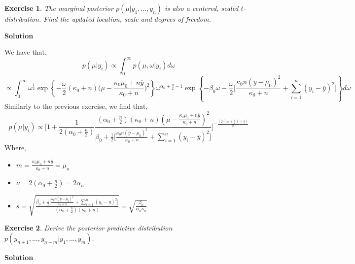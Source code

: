 \documentclass[twoside]{article}
\newcounter{lecnum}
\newtheorem{exercise}{Exercise}[lecnum]
\begin{document}
\color{black}

\begin{exercise}
  The marginal posterior $p(\mu|y_1,\dots, y_n)$ is also a centered, scaled $t$-distribution. Find the updated location, scale and degrees of freedom.
\end{exercise}

\color{blue}
\textbf{Solution}

We have that,
$$p(\mu|y_i) \propto \int_{0}^{\infty } p(\mu, \omega |y_i) d\omega $$
$$ \propto  \int_{0}^{\infty } 
\omega^{\frac{1}{2}} \exp\left\{ -\frac{\omega}{2}  (\kappa_0 + n)  \bigg( \mu - \frac{\kappa_0 \mu_0 + n\overline{y}}{\kappa_0 + n} \bigg)^2 \right\} 
\omega^{\alpha_0 + \frac{n}{2}-1 } \exp\left\{ -\beta_0 \omega
-\frac{\omega}{2} \bigg[
\frac{\kappa_0 n (\overline{y}-\mu_0)^2}{\kappa_0+n} + \sum_{i=1}^{n} (y_i - \overline{y})^2 \bigg]
\right\}  d\omega$$
Similarly to the previous exercise, we find that, 
$$p(\mu|y_i) \propto 
\bigg[1 + \frac{1}{2(\alpha_0 + \frac{n}{2})}\frac{(\alpha_0 + \frac{n}{2})(\kappa_0 + n)(\mu - \frac{\kappa_0 \mu_0 + n\overline{y}}{\kappa_0 + n})^2}{ \beta_0 + \frac{1}{2} \bigg[
	\frac{\kappa_0 n (\overline{y}-\mu_0)^2}{\kappa_0+n} + \sum_{i=1}^{n} (y_i - \overline{y})^2 \bigg]}\bigg]^{-\frac{(2(\alpha_0 + \frac{n}{2}) +1 )}{2}}$$
Where,
\begin{itemize}
\item  $ m  =   \frac{\kappa_0 \mu_0 + n\overline{y}}{\kappa_0 + n} = \mu_n$
\item  $ \nu= 2 ( \alpha_0 + \frac{n}{2})= 2 \alpha_n $
\item $ s = \sqrt{\frac{\beta_0 + \frac{1}{2} \bigg[
		\frac{\kappa_0 n (\overline{y}-\mu_0)^2}{\kappa_0+n} + \sum_{i=1}^{n} (y_i - \overline{y})^2 \bigg] }{(\alpha_0 + \frac{n}{2})(\kappa_0 + n)}} = \sqrt{\frac{\beta_n}{\alpha_n \kappa_n}}$
\end{itemize}
 
\color{black}

\begin{exercise}
  Derive the posterior predictive distribution $p(y_{n+1},\dots, y_{n+m}|y_1,\dots, y_{m})$.
\end{exercise}

\color{blue}
\textbf{Solution}
\end{document}
